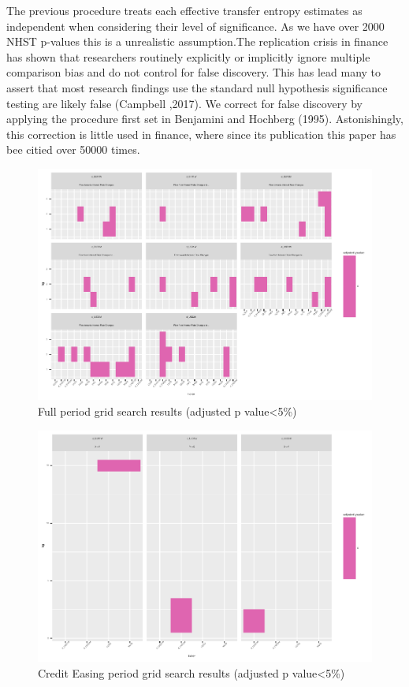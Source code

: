 \documentclass[
]{article}
\begin{document}
The previous procedure treats each effective transfer entropy estimates
as independent when considering their level of significance. As we have
over 2000 NHST p-values this is a unrealistic assumption.The replication
crisis in finance has shown that researchers routinely explicitly or
implicitly ignore multiple comparison bias and do not control for false
discovery. This has lead many to assert that most research findings use
the standard null hypothesis significance testing are likely false
(Campbell ,2017). We correct for false discovery by applying the
procedure first set in Benjamini and Hochberg (1995). Astonishingly,
this correction is little used in finance, where since its publication
this paper has bee citied over 50000 times.

\begin{figure}
\centering
\includegraphics{working_paper_files/figure-latex/fullless6-1.pdf}
\caption{Full period grid search results (adjusted p value\textless5\%)}
\end{figure}

\begin{figure}
\centering
\includegraphics{working_paper_files/figure-latex/CE7-1.pdf}
\caption{Credit Easing period grid search results (adjusted p
value\textless5\%)}
\end{figure}
\end{document}
